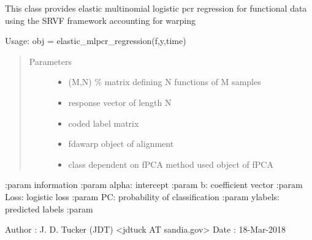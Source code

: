 \documentclass[letterpaper,10pt,english]{sphinxmanual}
\begin{document}
\begin{fulllineitems}
\label{\detokenize{pcr_regression:pcr_regression.elastic_mlpcr_regression}}
This class provides elastic multinomial logistic pcr regression for functional
data using the SRVF framework accounting for warping

Usage:  obj = elastic\_mlpcr\_regression(f,y,time)
\begin{quote}\begin{description}
\item[{Parameters}] \leavevmode\begin{itemize}
\item {} 
 \textendash{} (M,N) \% matrix defining N functions of M samples

\item {} 
 \textendash{} response vector of length N

\item {} 
 \textendash{} coded label matrix

\item {} 
 \textendash{} fdawarp object of alignment

\item {} 
 \textendash{} class dependent on fPCA method used object of fPCA

\end{itemize}

\end{description}\end{quote}

:param information
:param alpha: intercept
:param b: coefficient vector
:param Loss: logistic loss
:param PC: probability of classification
:param ylabels: predicted labels
:param

Author :  J. D. Tucker (JDT) \textless{}jdtuck AT sandia.gov\textgreater{}
Date   :  18-Mar-2018


\end{fulllineitems}
\end{document}
